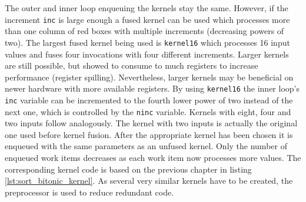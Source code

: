 The outer and inner loop enqueuing the kernels stay the same. However, if the increment \lstinline!inc! is large enough a fused kernel can be used which processes more than one column of red boxes with multiple increments (decreasing powers of two). The largest fused kernel being used is \lstinline!kernel16! which processes 16 input values and fuses four invocations with four different increments. Larger kernels are still possible, but showed to consume to much registers to increase performance (register spilling). Nevertheless, larger kernels may be beneficial on newer hardware with more available registers. By using \lstinline!kernel16! the inner loop's \lstinline!inc! variable can be incremented to the fourth lower power of two instead of the next one, which is controlled by the \lstinline!ninc! variable. Kernels with eight, four and two inputs follow analogously. The kernel with two inputs is actually the original one used before kernel fusion.
After the appropriate kernel has been chosen it is enqueued with the same parameters as an unfused kernel. Only the number of enqueued work items decreases as each work item now processes more values.
The corresponding kernel code is based on the previous chapter in listing \ref{lst:sort_bitonic_kernel}. As several very similar kernels have to be created, the preprocessor is used to reduce redundant code.



